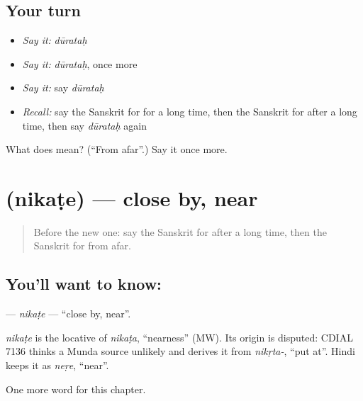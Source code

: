 \subsection*{Your turn}
\begin{itemize}
\raggedright
  \item \emph{Say it:} \emph{dūrataḥ}
  \item \emph{Say it:} \emph{dūrataḥ}, once more
  \item \emph{Say it:} say \emph{dūrataḥ}
  \item \emph{Recall:} say the Sanskrit for for a long time, then the Sanskrit for after a long time, then say \emph{dūrataḥ} again
\end{itemize}

\begin{tcolorbox}[breakable,colback=teal!4,colframe=teal!35!black,title={Before you move on}]
What does  mean? (\textquotedblleft{}From afar\textquotedblright{}.) Say it once more.
\end{tcolorbox}
\section[\texorpdfstring{\sk{निकटे} (nikaṭe)}{निकटे (nikaṭe)}]{ (nikaṭe) — close by, near}

\label{lesson:SA-C184-nikate}



\begin{quote}
Before the new one: say the Sanskrit for after a long time, then the Sanskrit for from afar.
\end{quote}

\subsection*{You'll want to know: }
\textbf{} — \emph{nikaṭe} — \textquotedblleft{}close by, near\textquotedblright{}.

\begin{cousinweb}
\emph{nikaṭe} is the locative of \emph{nikaṭa}, \textquotedblleft{}nearness\textquotedblright{} (MW). Its origin is disputed: CDIAL 7136 thinks a Munda source unlikely and derives it from \emph{nikṛta-}, \textquotedblleft{}put at\textquotedblright{}. Hindi keeps it as \emph{neṛe}, \textquotedblleft{}near\textquotedblright{}.
\end{cousinweb}

\begin{grammarlens}[title={What you've built}]
One more word for this chapter.
\end{grammarlens}

